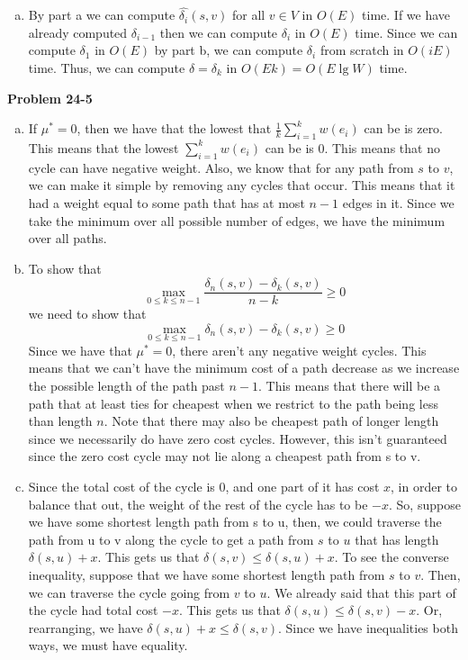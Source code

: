 \documentclass{article}
\begin{document}
\begin{enumerate}[a.]
\item By part a we can compute $\hat{\delta_i}(s,v)$ for all $v \in V$ in $O(E)$ time.  If we have already computed $\delta_{i-1}$ then we can compute $\delta_i$ in $O(E)$ time.  Since we can compute $\delta_1$ in $O(E)$ by part b, we can compute $\delta_i$ from scratch in $O(iE)$ time.  Thus, we can compute $\delta = \delta_k$ in $O(Ek) = O(E\lg W)$ time. \\
\end{enumerate}

\noindent\textbf{Problem 24-5}\\

\begin{enumerate}[a.]
\item
If $\mu^* =0$, then we have that the lowest that $\frac{1}{k}\sum_{i=1}^k w(e_i)$ can be is zero. This means that the lowest $\sum_{i=1}^k w(e_i)$ can be is 0. This means that no cycle can have negative weight. Also, we know that for any path from $s$ to $v$, we can make it simple by removing any cycles that occur. This means that it had a weight equal to some path that has at most $n-1$ edges in it. Since we take the minimum over all possible number of edges, we have the minimum over all paths.
\item
To show that 
\[
\max_{0\le k\le n-1} \frac{\delta_n(s,v) - \delta_k(s,v)}{n-k} \ge 0
\]
we need to show that
\[
\max_{0\le k\le n-1} \delta_n(s,v) - \delta_k(s,v) \ge 0
\]
Since we have that $\mu^*=0$, there aren't any negative weight cycles. This means that we can't have the minimum cost of a path decrease as we increase the possible length of the path past $n-1$. This means that there will be a path that at least ties for cheapest when we restrict to the path being less than length $n$. Note that there may also be cheapest path of longer length since we necessarily do have zero cost cycles. However, this isn't guaranteed since the zero cost cycle may not lie along a cheapest path from s to v.

\item
Since the total cost of the cycle is 0, and one part of it has cost $x$, in order to balance that out, the weight of the rest of the cycle has to be $-x$. So, suppose we have some shortest length path from s to u, then, we could traverse the path from u to v along the cycle to get a path from $s$ to $u$ that has length $\delta(s,u)+x$. This gets us that $\delta(s,v) \le \delta(s,u)+x$. To see the converse inequality, suppose that we have some shortest length path from $s$ to $v$. Then, we can traverse the cycle going from $v$ to $u$. We already said that this part of the cycle had total cost $-x$. This gets us that $\delta(s,u) \le \delta(s,v)-x$. Or, rearranging, we have $\delta(s,u)+x \le \delta(s,v)$. Since we have inequalities both ways, we must have equality.


\end{enumerate}
\end{document}
